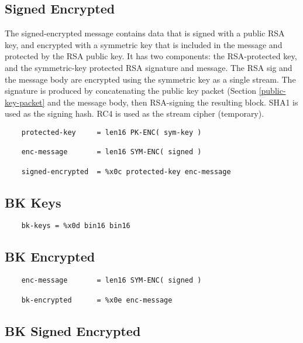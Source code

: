 \documentclass[letterpaper,11pt,oneside]{article}
\begin{document}
\subsection{Signed Encrypted}

The signed-encrypted message contains data that is signed with a public RSA
key, and encrypted with a symmetric key that is included in the message and
protected by the RSA public key. It has two components: the RSA-protected key,
and the symmetric-key protected RSA signature and message. The RSA sig and the
message body are encrypted using the symmetric key as a single stream. The
signature is produced by concatenating the public key packet (Section
\ref{public-key-packet} and the message body, then RSA-signing the resulting
block. SHA1 is used as the signing hash. RC4 is used as the stream cipher
(temporary).

\vspace{10pt}
\begin{verbatim}
    protected-key     = len16 PK-ENC( sym-key )

    enc-message       = len16 SYM-ENC( signed )

    signed-encrypted  = %x0c protected-key enc-message
\end{verbatim}
\vspace{10pt}

\subsection{BK Keys}

\vspace{10pt}
\begin{verbatim}
    bk-keys = %x0d bin16 bin16
\end{verbatim}
\vspace{10pt}

\subsection{BK Encrypted}

\vspace{10pt}
\begin{verbatim}
    enc-message       = len16 SYM-ENC( signed )

    bk-encrypted      = %x0e enc-message
\end{verbatim}
\vspace{10pt}


\subsection{BK Signed Encrypted}
\end{document}
